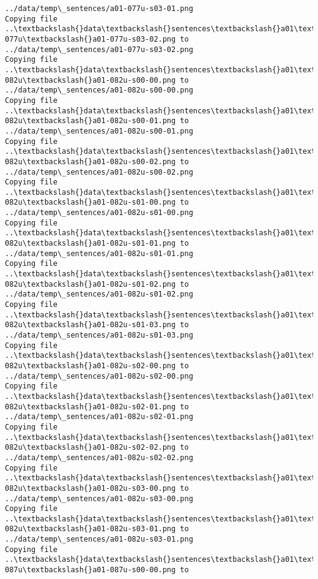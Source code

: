 \documentclass[11pt]{article}
\begin{document}
\begin{Verbatim}[commandchars=\\\{\}]
../data/temp\_sentences/a01-077u-s03-01.png
Copying file ..\textbackslash{}data\textbackslash{}sentences\textbackslash{}a01\textbackslash{}a01-077u\textbackslash{}a01-077u-s03-02.png to
../data/temp\_sentences/a01-077u-s03-02.png
Copying file ..\textbackslash{}data\textbackslash{}sentences\textbackslash{}a01\textbackslash{}a01-082u\textbackslash{}a01-082u-s00-00.png to
../data/temp\_sentences/a01-082u-s00-00.png
Copying file ..\textbackslash{}data\textbackslash{}sentences\textbackslash{}a01\textbackslash{}a01-082u\textbackslash{}a01-082u-s00-01.png to
../data/temp\_sentences/a01-082u-s00-01.png
Copying file ..\textbackslash{}data\textbackslash{}sentences\textbackslash{}a01\textbackslash{}a01-082u\textbackslash{}a01-082u-s00-02.png to
../data/temp\_sentences/a01-082u-s00-02.png
Copying file ..\textbackslash{}data\textbackslash{}sentences\textbackslash{}a01\textbackslash{}a01-082u\textbackslash{}a01-082u-s01-00.png to
../data/temp\_sentences/a01-082u-s01-00.png
Copying file ..\textbackslash{}data\textbackslash{}sentences\textbackslash{}a01\textbackslash{}a01-082u\textbackslash{}a01-082u-s01-01.png to
../data/temp\_sentences/a01-082u-s01-01.png
Copying file ..\textbackslash{}data\textbackslash{}sentences\textbackslash{}a01\textbackslash{}a01-082u\textbackslash{}a01-082u-s01-02.png to
../data/temp\_sentences/a01-082u-s01-02.png
Copying file ..\textbackslash{}data\textbackslash{}sentences\textbackslash{}a01\textbackslash{}a01-082u\textbackslash{}a01-082u-s01-03.png to
../data/temp\_sentences/a01-082u-s01-03.png
Copying file ..\textbackslash{}data\textbackslash{}sentences\textbackslash{}a01\textbackslash{}a01-082u\textbackslash{}a01-082u-s02-00.png to
../data/temp\_sentences/a01-082u-s02-00.png
Copying file ..\textbackslash{}data\textbackslash{}sentences\textbackslash{}a01\textbackslash{}a01-082u\textbackslash{}a01-082u-s02-01.png to
../data/temp\_sentences/a01-082u-s02-01.png
Copying file ..\textbackslash{}data\textbackslash{}sentences\textbackslash{}a01\textbackslash{}a01-082u\textbackslash{}a01-082u-s02-02.png to
../data/temp\_sentences/a01-082u-s02-02.png
Copying file ..\textbackslash{}data\textbackslash{}sentences\textbackslash{}a01\textbackslash{}a01-082u\textbackslash{}a01-082u-s03-00.png to
../data/temp\_sentences/a01-082u-s03-00.png
Copying file ..\textbackslash{}data\textbackslash{}sentences\textbackslash{}a01\textbackslash{}a01-082u\textbackslash{}a01-082u-s03-01.png to
../data/temp\_sentences/a01-082u-s03-01.png
Copying file ..\textbackslash{}data\textbackslash{}sentences\textbackslash{}a01\textbackslash{}a01-087u\textbackslash{}a01-087u-s00-00.png to

\end{Verbatim}
\end{document}
